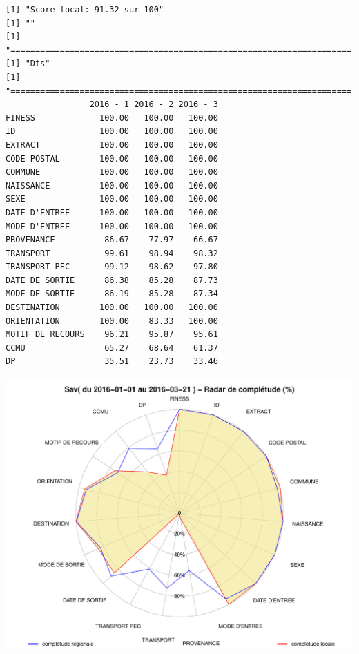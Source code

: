 \documentclass[]{article}
\begin{document}
\begin{verbatim}
[1] "Score local: 91.32 sur 100"
[1] ""
[1] "====================================================================="
[1] "Dts"
[1] "====================================================================="
                 2016 - 1 2016 - 2 2016 - 3
FINESS             100.00   100.00   100.00
ID                 100.00   100.00   100.00
EXTRACT            100.00   100.00   100.00
CODE POSTAL        100.00   100.00   100.00
COMMUNE            100.00   100.00   100.00
NAISSANCE          100.00   100.00   100.00
SEXE               100.00   100.00   100.00
DATE D'ENTREE      100.00   100.00   100.00
MODE D'ENTREE      100.00   100.00   100.00
PROVENANCE          86.67    77.97    66.67
TRANSPORT           99.61    98.94    98.32
TRANSPORT PEC       99.12    98.62    97.80
DATE DE SORTIE      86.38    85.28    87.73
MODE DE SORTIE      86.19    85.28    87.34
DESTINATION        100.00   100.00   100.00
ORIENTATION        100.00    83.33   100.00
MOTIF DE RECOURS    96.21    95.87    95.61
CCMU                65.27    68.64    61.37
DP                  35.51    23.73    33.46
\end{verbatim}

\includegraphics{completude_files/figure-latex/finess-10.pdf}
\end{document}
